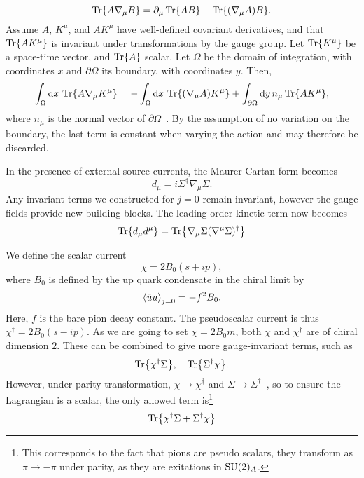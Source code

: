 \begin{equation*}
    \Tr{A \nabla_\mu B} = \partial_\mu \Tr{AB} - \Tr{(\nabla_\mu A) B}.
\end{equation*}
Assume $A$, $K^\mu$, and $A K^\mu$ have well-defined covariant derivatives, and that $\Tr{A K^\mu}$ is invariant under transformations by the gauge group.
Let $\Tr{K^\mu}$ be a space-time vector, and $\Tr{A}$ scalar. 
Let $\Omega$ be the domain of integration, with coordinates $x$ and $\partial \Omega$ its boundary, with coordinates $y$. Then, 
\begin{align*}
    \int_\Omega \dd x \, \Tr{A \nabla_\mu K^\mu} 
    = 
    - \int_\Omega \dd x \, \Tr{(\nabla_\mu A) K^\mu}
    + \int_{\partial\Omega} \dd y\, n_\mu \Tr{A K^\mu},
\end{align*}
where $n_\mu$ is the normal vector of $\partial \Omega$~\cite{Carroll:space-time}.
By the assumption of no variation on the boundary, the last term is constant when varying the action and may therefore be discarded.

In the presence of external source-currents, the Maurer-Cartan form becomes
\begin{equation}
    d_\mu = i \Sigma^\dagger \nabla_\mu \Sigma.
\end{equation}
Any invariant terms we constructed for $j=0$ remain invariant, however the gauge fields provide new building blocks.
The leading order kinetic term now becomes
\begin{equation}
    \label{leading order term sigma}
    \Tr{d_\mu d^\mu} = \Tr{\nabla_\mu \Sigma (\nabla^\mu \Sigma)^\dagger}
\end{equation}

We define the scalar current
\begin{equation}
    \chi = 2 B_0 (s + ip),
\end{equation}
where $B_0$ is defined by the up quark condensate in the chiral limit by
\begin{equation}
    \ex{\bar u u}_{j = 0} = - f^2 B_0.
\end{equation}
Here, $f$ is the bare pion decay constant.
The pseudoscalar current is thus $\chi^\dagger = 2 B_0 (s - ip)$.
As we are going to set $\chi = 2 B_0 m$, both $\chi$ and $\chi^\dagger$ are of chiral dimension $2$.
These can be combined to give more gauge-invariant terms, such as
\begin{equation}
    \Tr{\chi^\dagger \Sigma}, \quad \Tr{\Sigma^\dagger \chi}.
\end{equation}
However, under parity transformation, $\chi \rightarrow \chi^\dagger$ and $\Sigma \rightarrow \Sigma^\dagger$~\cite{Scherer2002IntroductionTC}, so to ensure the Lagrangian is a scalar, the only allowed term is\footnote{This corresponds to the fact that pions are pseudo scalars, they transform as $\pi \rightarrow - \pi$ under parity, as they are exitations in $\mathrm{SU}(2)_A$.}
\begin{equation}
    \label{leading order chi sigma term}
    \Tr{\chi^\dagger \Sigma + \Sigma^\dagger \chi}
\end{equation}

